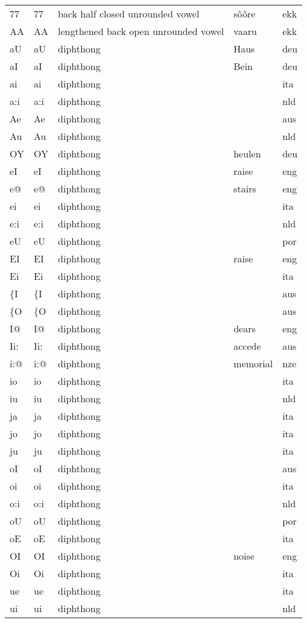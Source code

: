 \begin{longtable}{llp{}ll}
	77 & 77 & back half closed unrounded vowel & sõõre & ekk\\
	AA & AA & lengthened back open unrounded vowel & vaaru & ekk\\
	aU & aU & diphthong & Haus & deu\\
	aI & aI & diphthong & Bein & deu\\
	ai & ai & diphthong & & ita\\
	a:i & a:i & diphthong & & nld\\
	Ae & Ae & diphthong & & aus\\
	Au & Au & diphthong & & nld\\
	OY & OY & diphthong & heulen & deu\\
	eI & eI & diphthong & raise & eng\\
	e@ & e@ & diphthong & stairs & eng\\
	ei & ei & diphthong & & ita\\
	e:i & e:i & diphthong & & nld\\
	eU & eU & diphthong & & por\\
	EI & EI & diphthong & raise & eng\\
	Ei & Ei & diphthong & & ita\\
	\{I & \{I & diphthong & & aus\\
	\{O & \{O & diphthong & & aus\\
	I@ & I@ & diphthong & dears & eng\\
	Ii: & Ii: & diphthong & accede & aus\\
	i:@ & i:@ & diphthong & memorial & nze\\
	io & io & diphthong & & ita\\
	iu & iu & diphthong & & nld\\
	ja & ja & diphthong & & ita\\
	jo & jo & diphthong & & ita\\
	ju & ju & diphthong & & ita\\
	oI & oI & diphthong & & aus\\
	oi & oi & diphthong & & ita\\
	o:i & o:i & diphthong & & nld\\
	oU & oU & diphthong & & por\\
	oE & oE & diphthong & & ita\\
	OI & OI & diphthong & noise & eng\\
	Oi & Oi & diphthong & & ita\\
	ue & ue & diphthong & & ita\\
	ui & ui & diphthong & & nld\\

\end{longtable}
